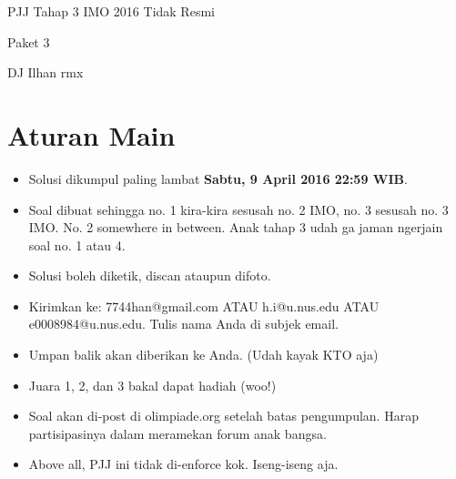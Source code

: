 \documentclass{article}
\begin{document}
	\begin{center}
		{\huge PJJ Tahap 3 IMO 2016 Tidak Resmi}
		
		\vspace{1em}
		
		{\Large Paket 3}
		
		\vspace{1em}
		
		DJ Ilhan rmx
	\end{center}
	\section{Aturan Main}
	\begin{itemize}
		\item Solusi dikumpul paling lambat \textbf{Sabtu, 9 April 2016 22:59 WIB}.
		\item Soal dibuat sehingga no. 1 kira-kira sesusah no. 2 IMO, no. 3 sesusah no. 3 IMO. No. 2 somewhere in between. Anak tahap 3 udah ga jaman ngerjain soal no. 1 atau 4.
		\item Solusi boleh diketik, discan ataupun difoto.
		\item Kirimkan ke: 7744han@gmail.com ATAU h.i@u.nus.edu ATAU e0008984@u.nus.edu. Tulis nama Anda di subjek email.
		\item Umpan balik akan diberikan ke Anda. (Udah kayak KTO aja)
		\item Juara 1, 2, dan 3 bakal dapat hadiah (woo!)
		\item Soal akan di-post di olimpiade.org setelah batas pengumpulan. Harap partisipasinya dalam meramekan forum anak bangsa.
		\item Above all, PJJ ini tidak di-enforce kok. Iseng-iseng aja.
	\end{itemize}
\end{document}
